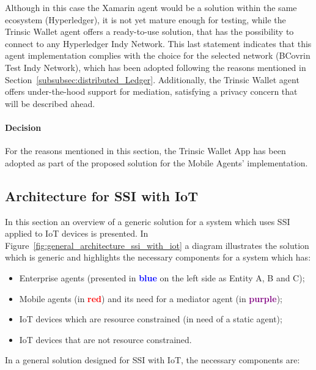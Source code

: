 Although in this case the Xamarin agent would be a solution within the same ecosystem (Hyperledger), it is not yet mature enough for testing, while the Trinsic Wallet agent offers a ready-to-use solution, that has the possibility to connect to any Hyperledger Indy Network. This last statement indicates that this agent implementation complies with the choice for the selected network (BCovrin Test Indy Network), which has been adopted following the reasons mentioned in Section~\ref{subsubsec:distributed_Ledger}. Additionally, the Trinsic Wallet agent offers under-the-hood support for mediation, satisfying a privacy concern that will be described ahead.

\paragraph{Decision}

For the reasons mentioned in this section, the Trinsic Wallet App has been adopted as part of the proposed solution for the Mobile Agents' implementation.

\subsection{Architecture for SSI with IoT}
\label{subsec:architecture_for_ssi_with_iot}

In this section an overview of a generic solution for a system which uses SSI applied to IoT devices is presented. In Figure~\ref{fig:general_architecture_ssi_with_iot} a diagram illustrates the solution which is generic and highlights the necessary components for a system which has: 
\begin{itemize}
    \item Enterprise agents (presented in \textcolor{blue}{\textbf{blue}} on the left side as Entity A, B and C); 
    \item Mobile agents (in \textcolor{red}{\textbf{red}}) and its need for a mediator agent (in \textcolor{purple}{\textbf{purple}});
    \item IoT devices which are resource constrained (in need of a static agent);
    \item IoT devices that are not resource constrained.
\end{itemize}

In a general solution designed for SSI with IoT, the necessary components are:

